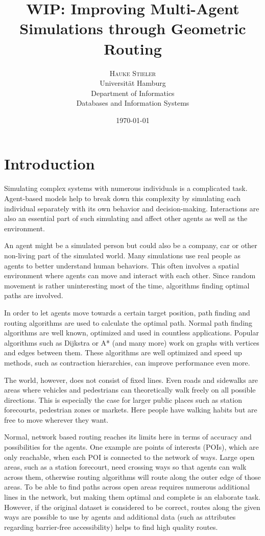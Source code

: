 \documentclass[
	a4paper,
	11pt,
	twoside,
	twocolumn
]{article}
\title{WIP: Improving Multi-Agent Simulations through Geometric Routing}
\author{%
	\textsc{Hauke Stieler} \\[1ex]
	\normalsize Universit\"at Hamburg \\ 
	\normalsize Department of Informatics \\
	\normalsize Databases and Information Systems \\
}
\date{\today}
\begin{document}
	\maketitle
	
	\section{Introduction}
		
		Simulating complex systems with numerous individuals is a complicated task.
		Agent-based models help to break down this complexity by simulating each individual separately with its own behavior and decision-making. \cite{macal2014introductory}
		Interactions are also an essential part of such simulating and affect other agents as well as the environment.
		
		An agent might be a simulated person but could also be a company, car or other non-living part of the simulated world.
		Many simulations use real people as agents to better understand human behaviors.
		This often involves a spatial environment where agents can move and interact with each other.
		Since random movement is rather uninteresting most of the time, algorithms finding optimal paths are involved. 
		
		In order to let agents move towards a certain target position, path finding and routing algorithms are used to calculate the optimal path.
		Normal path finding algorithms are well known, optimized and used in countless applications.
		Popular algorithms such as Dijkstra or A* (and many more) work on graphs with vertices and edges between them.
		These algorithms are well optimized and speed up methods, such as contraction hierarchies, can improve performance even more. \cite[57]{geisberger2008contraction}

		The world, however, does not consist of fixed lines.
		Even roads and sidewalks are areas where vehicles and pedestrians can theoretically walk freely on all possible directions.
		This is especially the case for larger public places such as station forecourts, pedestrian zones or markets.
		Here people have walking habits but are free to move wherever they want.
		
		Normal, network based routing reaches its limits here in terms of accuracy and possibilities for the agents.
		One example are points of interests (POIs), which are only reachable, when each POI is connected to the network of ways.
		Large open areas, such as a station forecourt, need crossing ways so that agents can walk across them, otherwise routing algorithms will route along the outer edge of those areas.
		To be able to find paths across open areas requires numerous additional lines in the network, but making them optimal and complete is an elaborate task.
		However, if the original dataset is considered to be correct, routes along the given ways are possible to use by agents and additional data (such as attributes regarding barrier-free accessibility) helps to find high quality routes.
		
\end{document}
